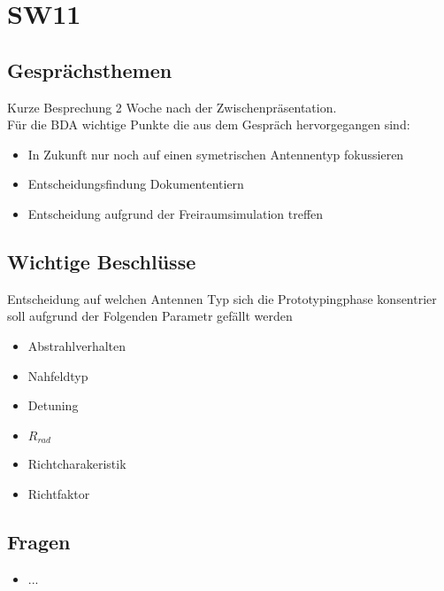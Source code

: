 \documentclass[10pt,a4paper]{article}
\begin{document}
\section*{SW11}

\subsection*{Gesprächsthemen}

Kurze Besprechung 2 Woche nach der Zwischenpräsentation.\\

\vspace{10 mm}
Für die BDA wichtige Punkte die aus dem Gespräch hervorgegangen sind:
\begin{itemize}
	\item In Zukunft nur noch auf einen symetrischen Antennentyp fokussieren
	\item Entscheidungsfindung Dokumententiern
	\item Entscheidung aufgrund der Freiraumsimulation treffen
	
\end{itemize}

\subsection*{Wichtige Beschlüsse}
Entscheidung auf welchen Antennen Typ sich die Prototypingphase konsentrier soll aufgrund der Folgenden Parametr gefällt werden
\begin{itemize}
	\item Abstrahlverhalten
	\item Nahfeldtyp
	\item Detuning 
	\item $R_{rad}$
	\item Richtcharakeristik
	\item Richtfaktor 
\end{itemize}
\subsection*{Fragen}
\begin{itemize}
	\item ...
\end{itemize}
\end{document}
